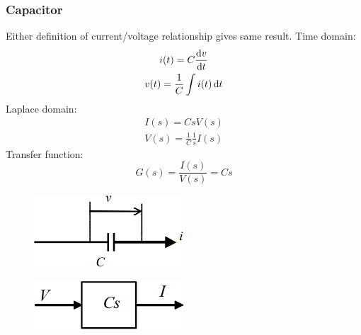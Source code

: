 \documentclass[class=report, crop=false, 12pt,a4paper, tikz, border=4mm]{standalone}
\begin{document}
\subsubsection{Capacitor}
Either definition of current/voltage relationship gives same result. Time domain:
\begin{gather}
  i(t) = C\frac{\dif v}{\dif t}\\
  v(t) = \frac{1}{C}\int i(t) \dif t
\end{gather}
Laplace domain:
\begin{gather}
  I(s) = CsV(s)\\
  V(s) = \frac{1}{C} \frac{1}{s} I(s)
\end{gather}
Transfer function:
\begin{equation}
  G(s) = \frac{I(s)}{V(s)} = Cs
\end{equation}
\begin{figure}[H]
  \centering
  \includegraphics[width = 0.5\textwidth]{../img/diagram6.png}
\end{figure}
\begin{figure}[H]
  \centering
  \includegraphics[width = 0.5\textwidth]{../img/blockdiagram17.png}
\end{figure}
\end{document}
